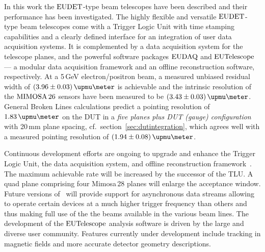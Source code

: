 

In this work the $\textrm{EUDET}$-type beam telescopes have been described and their performance has been investigated. 
The highly flexible and versatile $\textrm{EUDET}$-type beam telescopes come with a Trigger Logic Unit with time stamping capabilities and a clearly defined interface for an integration of user data acquisition systems.
It is complemented by a data acquisition system for the telescope planes, and the powerful software packages $\textrm{EUDAQ}$ and $\textrm{EUTelescope}$
 ---  a modular data acquisition framework and an offline reconstruction software, respectively. 
At a 5\,GeV electron/positron beam, a measured unbiased residual width of $(3.96 \pm 0.03)\,\upmu\meter$ is achievable
 and the intrinsic resolution of the $\textrm{MIMOSA\,26}$ sensors have been measured to be $(3.43 \pm 0.03)\,\upmu\meter$.
General Broken Lines calculations predict a pointing resolution of $1.83\,\upmu\meter$ on the DUT in a \textit{five planes plus DUT (gauge) configuration} with 20\,mm plane spacing,
 cf.~section~\ref{sec:dutintegration},
 which agrees well with a measured pointing resolution of $(1.94 \pm 0.08)\,\upmu\meter$.

Continuous development efforts are ongoing to upgrade and enhance the Trigger Logic Unit, the data acquisition system, and offline reconstruction framework~\cite{ref:tipp2014_eudaq}.  
The maximum achievable rate will be increased by the successor of the TLU. 
A quad plane comprising four Mimosa\,28 planes will enlarge the acceptance window. 
Future versions of \eudaq\ will provide support for asynchronous data streams allowing to operate certain devices at a much higher trigger frequency than others
 and thus making full use of the the beams available in the various beam lines.
The development of the $\textrm{EUTelescope}$ analysis software is driven by the large and diverse user community. 
Features currently under development include tracking in magnetic fields and more accurate detector geometry descriptions. 
